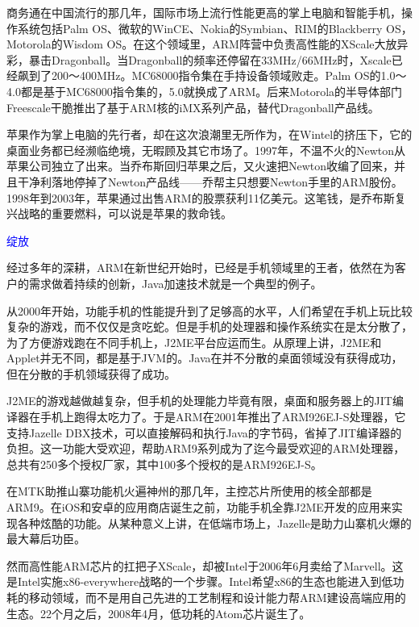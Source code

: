 \documentclass[utf8]{book}
\begin{document}
	商务通在中国流行的那几年，国际市场上流行性能更高的掌上电脑和智能手机，操作系统包括Palm OS、微软的WinCE、Nokia的Symbian、RIM的Blackberry OS，Motorola的Wisdom OS。在这个领域里，ARM阵营中负责高性能的XScale大放异彩，暴击Dragonball。当Dragonball的频率还停留在33MHz/66MHz时，Xscale已经飙到了200～400MHz。MC68000指令集在手持设备领域败走。Palm OS的1.0～4.0都是基于MC68000指令集的，5.0就换成了ARM。后来Motorola的半导体部门Freescale干脆推出了基于ARM核的iMX系列产品，替代Dragonball产品线。
	
	苹果作为掌上电脑的先行者，却在这次浪潮里无所作为，在Wintel的挤压下，它的桌面业务都已经濒临绝境，无暇顾及其它市场了。1997年，不温不火的Newton从苹果公司独立了出来。当乔布斯回归苹果之后，又火速把Newton收编了回来，并且干净利落地停掉了Newton产品线——乔帮主只想要Newton手里的ARM股份。1998年到2003年，苹果通过出售ARM的股票获利11亿美元。这笔钱，是乔布斯复兴战略的重要燃料，可以说是苹果的救命钱。
	
	\begin{flushleft}
		{\LARGE \textcolor{blue}{绽放}}
	\end{flushleft}

	
	经过多年的深耕，ARM在新世纪开始时，已经是手机领域里的王者，依然在为客户的需求做着持续的创新，Java加速技术就是一个典型的例子。
	
	从2000年开始，功能手机的性能提升到了足够高的水平，人们希望在手机上玩比较复杂的游戏，而不仅仅是贪吃蛇。但是手机的处理器和操作系统实在是太分散了，为了方便游戏跑在不同手机上，J2ME平台应运而生。从原理上讲，J2ME和Applet并无不同，都是基于JVM的。Java在并不分散的桌面领域没有获得成功，但在分散的手机领域获得了成功。
	
	J2ME的游戏越做越复杂，但手机的处理能力毕竟有限，桌面和服务器上的JIT编译器在手机上跑得太吃力了。于是ARM在2001年推出了ARM926EJ-S处理器，它支持Jazelle DBX技术，可以直接解码和执行Java的字节码，省掉了JIT编译器的负担。这一功能大受欢迎，帮助ARM9系列成为了迄今最受欢迎的ARM处理器，总共有250多个授权厂家，其中100多个授权的是ARM926EJ-S。
	
	在MTK助推山寨功能机火遍神州的那几年，主控芯片所使用的核全部都是ARM9。在iOS和安卓的应用商店诞生之前，功能手机全靠J2ME开发的应用来实现各种炫酷的功能。从某种意义上讲，在低端市场上，Jazelle是助力山寨机火爆的最大幕后功臣。
	
	然而高性能ARM芯片的扛把子XScale，却被Intel于2006年6月卖给了Marvell。这是Intel实施x86-everywhere战略的一个步骤。Intel希望x86的生态也能进入到低功耗的移动领域，而不是用自己先进的工艺制程和设计能力帮ARM建设高端应用的生态。22个月之后，2008年4月，低功耗的Atom芯片诞生了。
	
\end{document}
